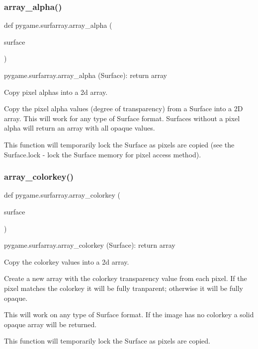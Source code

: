 \subsubsection{\texorpdfstring{array\+\_\+alpha()}{array\_alpha()}}
{\footnotesize\ttfamily def pygame.\+surfarray.\+array\+\_\+alpha (\begin{DoxyParamCaption}\item[{}]{surface }\end{DoxyParamCaption})}

\begin{DoxyVerb}pygame.surfarray.array_alpha (Surface): return array

Copy pixel alphas into a 2d array.

Copy the pixel alpha values (degree of transparency) from a Surface
into a 2D array. This will work for any type of Surface
format. Surfaces without a pixel alpha will return an array with all
opaque values.

This function will temporarily lock the Surface as pixels are copied
(see the Surface.lock - lock the Surface memory for pixel access
method).
\end{DoxyVerb}
 \mbox{\label{namespacepygame_1_1surfarray_aee02078e9cd8468b52ac8d00c90e056e}} 
\subsubsection{\texorpdfstring{array\+\_\+colorkey()}{array\_colorkey()}}
{\footnotesize\ttfamily def pygame.\+surfarray.\+array\+\_\+colorkey (\begin{DoxyParamCaption}\item[{}]{surface }\end{DoxyParamCaption})}

\begin{DoxyVerb}pygame.surfarray.array_colorkey (Surface): return array

Copy the colorkey values into a 2d array.

Create a new array with the colorkey transparency value from each
pixel. If the pixel matches the colorkey it will be fully
tranparent; otherwise it will be fully opaque.

This will work on any type of Surface format. If the image has no
colorkey a solid opaque array will be returned.

This function will temporarily lock the Surface as pixels are
copied.
\end{DoxyVerb}
 \mbox{\label{namespacepygame_1_1surfarray_aeb3d21c3f35ba47c13217999d8c8df60}} 
